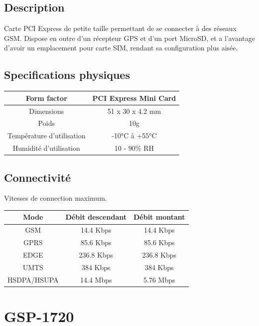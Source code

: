 \subsection{Description}

Carte PCI Express de petite taille permettant de se connecter à des réseaux GSM. Dispose en outre d'un récepteur GPS et d'un port MicroSD, et a l'avantage d'avoir un emplacement pour carte SIM, rendant sa configuration plus aisée.

\subsection{Specifications physiques}

\begin{tabular}{|c|c|}
\hline Form factor & PCI Express Mini Card \\ 
\hline Dimensions & 51 x 30 x 4.2 mm \\ 
\hline Poids & 10g \\
\hline Température d'utilisation & -10°C à +55°C \\
\hline Humidité d'utilisation & 10 - 90\% RH \\
\hline
\end{tabular} 

\subsection{Connectivité}

Vitesses de connection maximum.

\begin{tabular}{|c|c|c|}
\hline Mode & Débit descendant & Débit montant \\
\hline GSM & 14.4 Kbps & 14.4 Kbps \\
\hline GPRS & 85.6 Kbps & 85.6 Kbps \\
\hline EDGE & 236.8 Kbps & 236.8 Kbps \\
\hline UMTS & 384 Kbps & 384 Kbps \\
\hline HSDPA/HSUPA & 14.4 Mbps & 5.76 Mbps \\
\hline
\end{tabular}

\newpage
\section{GSP-1720}

